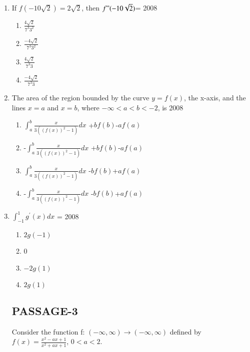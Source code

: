 \documentclass[journal,12pt,onecolumn]{IEEEtran}
\theoremstyle{remark}
\begin{document}
\begin{enumerate}
\item If $f(-10\sqrt{2})=2\sqrt{2}$, then $f"(-10\sqrt{2})$=
\hfill{2008}
\begin{enumerate}
    \item $\frac{4\sqrt{2}}{7^3 3^2}$
    \item $\frac{-4\sqrt{2}}{7^3 3^2}$ 
     \item $\frac{4\sqrt{2}}{7^3 3}$  
     \item $\frac{-4\sqrt{2}}{7^3 3}$ 
\end{enumerate}
\item The area of the region bounded by the curve $y=f(x)$, the x-axis, and the lines $x = a$ and $x = b$, where $-\infty <a<b<-2$, is
\hfill{2008}
\begin{enumerate}
    \item $\int_a^b\frac{x}{3((f(x))^2-1)}dx$ +$bf(b)$-$af(a)$ 
    \item -$\int_a^b\frac{x}{3((f(x))^2-1)}dx$ +$bf(b)$-$af(a)$
    \item $\int_a^b\frac{x}{3((f(x))^2-1)}dx$ -$bf(b)$+$af(a)$ 
    \item -$\int_a^b\frac{x}{3((f(x))^2-1)}dx$ -$bf(b)$+$af(a)$ 
\end{enumerate}
\item $\int_ {-1}^{1} g^{\prime}(x)dx$ =
\hfill{2008}
\begin{enumerate}
    \item $2g(-1)$
    \item 0
    \item $-2g(1)$
    \item $2g(1)$
\end{enumerate}
\subsection{PASSAGE-3}
Consider the function f: $(-\infty,\infty)\rightarrow(-\infty,\infty)$ defined by $f(x)=\frac{x^2 -ax+1}{x^2+ax+1}$, $ 0<a<2.$


\end{enumerate}
\end{document}
